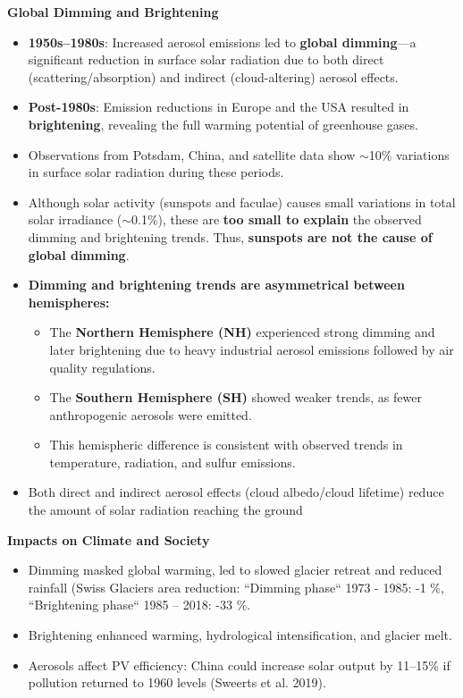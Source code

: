 \documentclass[fontsize=8pt, a4paper, landscape, fleqn]{scrartcl}
\renewcommand{\subsection}[1]{%
    \noindent\colorbox{subsectioncolor}{%
        \parbox{\dimexpr\columnwidth-2\fboxsep}{\color{white}\textbf{#1}}}%
    \vspace{0.5mm}%
}
\begin{document}
\begin{multicols*}{3}[\raggedcolumns]
\subsection{Global Dimming and Brightening}
\begin{itemize}
    \item \textbf{1950s–1980s}: Increased aerosol emissions led to \textbf{global dimming}—a significant reduction in surface solar radiation due to both direct (scattering/absorption) and indirect (cloud-altering) aerosol effects.
    \item \textbf{Post-1980s}: Emission reductions in Europe and the USA resulted in \textbf{brightening}, revealing the full warming potential of greenhouse gases.
    \item Observations from Potsdam, China, and satellite data show $\sim$10\% variations in surface solar radiation during these periods.
    \item Although solar activity (sunspots and faculae) causes small variations in total solar irradiance ($\sim$0.1\%), these are \textbf{too small to explain} the observed dimming and brightening trends. Thus, \textbf{sunspots are not the cause of global dimming}.
    \item \textbf{Dimming and brightening trends are asymmetrical between hemispheres:}
    \begin{itemize}
        \item The \textbf{Northern Hemisphere (NH)} experienced strong dimming and later brightening due to heavy industrial aerosol emissions followed by air quality regulations.
        \item The \textbf{Southern Hemisphere (SH)} showed weaker trends, as fewer anthropogenic aerosols were emitted.
        \item This hemispheric difference is consistent with observed trends in temperature, radiation, and sulfur emissions.
    \end{itemize}
    \item Both direct and indirect aerosol effects (cloud albedo/cloud lifetime) reduce the amount of solar radiation reaching the ground
\end{itemize}

\subsection{Impacts on Climate and Society}
\begin{itemize}
    \item Dimming masked global warming, led to slowed glacier retreat and reduced rainfall (Swiss Glaciers area reduction: “Dimming phase“ 1973 - 1985: -1 $\%$, “Brightening phase“ 1985 – 2018: -33 $\%$.
    \item Brightening enhanced warming, hydrological intensification, and glacier melt.
    \item Aerosols affect PV efficiency: China could increase solar output by 11–15\% if pollution returned to 1960 levels (Sweerts et al. 2019).
\end{itemize}


\end{multicols*}
\end{document}
